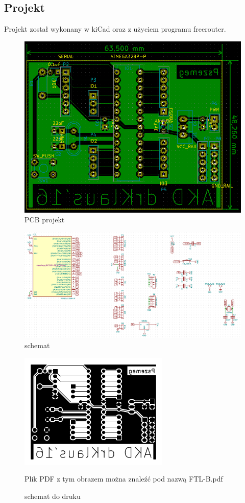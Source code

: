 \documentclass[a4paper,11pt]{article}
\def\SCALE{0.6}
\begin{document}
\subsection{Projekt}
Projekt został wykonany w kiCad oraz z użyciem programu freerouter.
\begin{figure}[H]
	\centering
	\includegraphics[width=\SCALE
	\paperwidth]{pcb}
	\caption{PCB projekt}
\end{figure}
\begin{figure}[H]
	\centering
	\includegraphics[width=\SCALE
	\paperwidth]{schemat}
	\caption{schemat}
\end{figure}
\begin{figure}[H]
	\centering
	\includegraphics[width=\SCALE
	\paperwidth]{FTL-B.png}
	\caption{schemat do druku}
	Plik PDF z tym obrazem można znaleźć pod nazwą FTL-B.pdf
\end{figure}
\end{document}
